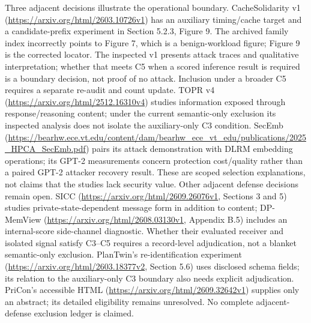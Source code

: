 Three adjacent decisions illustrate the operational boundary. CacheSolidarity v1 (\url{https://arxiv.org/html/2603.10726v1}) has an auxiliary timing/cache target and a candidate-prefix experiment in Section 5.2.3, Figure 9. The archived family index incorrectly points to Figure 7, which is a benign-workload figure; Figure 9 is the corrected locator. The inspected v1 presents attack traces and qualitative interpretation; whether that meets C5 when a scored inference result is required is a boundary decision, not proof of no attack. Inclusion under a broader C5 requires a separate re-audit and count update. TOPR v4 (\url{https://arxiv.org/html/2512.16310v4}) studies information exposed through response/reasoning content; under the current semantic-only exclusion its inspected analysis does not isolate the auxiliary-only C3 condition. SecEmb (\url{https://bearhw.ece.vt.edu/content/dam/bearhw_ece_vt_edu/publications/2025_HPCA_SecEmb.pdf}) pairs its attack demonstration with DLRM embedding operations; its GPT-2 measurements concern protection cost/quality rather than a paired GPT-2 attacker recovery result. These are scoped selection explanations, not claims that the studies lack security value. Other adjacent defense decisions remain open. SICC (\url{https://arxiv.org/html/2609.26076v1}, Sections 3 and 5) studies private-state-dependent message form in addition to content; DP-MemView (\url{https://arxiv.org/html/2608.03130v1}, Appendix B.5) includes an internal-score side-channel diagnostic. Whether their evaluated receiver and isolated signal satisfy C3--C5 requires a record-level adjudication, not a blanket semantic-only exclusion. PlanTwin's re-identification experiment (\url{https://arxiv.org/html/2603.18377v2}, Section 5.6) uses disclosed schema fields; its relation to the auxiliary-only C3 boundary also needs explicit adjudication. PriCon's accessible HTML (\url{https://arxiv.org/html/2609.32642v1}) supplies only an abstract; its detailed eligibility remains unresolved. No complete adjacent-defense exclusion ledger is claimed.

